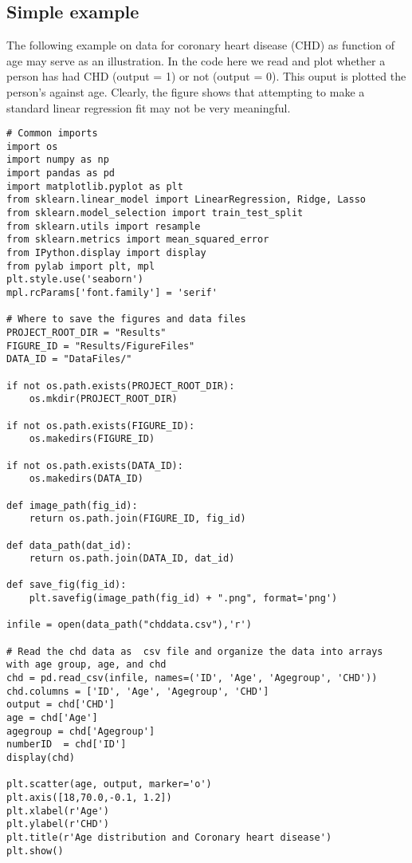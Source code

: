 \documentclass[%
oneside,                 %
final,                   %
10pt]{article}
\begin{document}
\subsection*{Simple example}

The following example on data for coronary heart disease (CHD) as function of age may serve as an illustration. In the code here we read and plot whether a person has had CHD (output = 1) or not (output = 0). This ouput  is plotted the person's against age. Clearly, the figure shows that attempting to make a standard linear regression fit may not be very meaningful.

\begin{verbatim}
# Common imports
import os
import numpy as np
import pandas as pd
import matplotlib.pyplot as plt
from sklearn.linear_model import LinearRegression, Ridge, Lasso
from sklearn.model_selection import train_test_split
from sklearn.utils import resample
from sklearn.metrics import mean_squared_error
from IPython.display import display
from pylab import plt, mpl
plt.style.use('seaborn')
mpl.rcParams['font.family'] = 'serif'

# Where to save the figures and data files
PROJECT_ROOT_DIR = "Results"
FIGURE_ID = "Results/FigureFiles"
DATA_ID = "DataFiles/"

if not os.path.exists(PROJECT_ROOT_DIR):
    os.mkdir(PROJECT_ROOT_DIR)

if not os.path.exists(FIGURE_ID):
    os.makedirs(FIGURE_ID)

if not os.path.exists(DATA_ID):
    os.makedirs(DATA_ID)

def image_path(fig_id):
    return os.path.join(FIGURE_ID, fig_id)

def data_path(dat_id):
    return os.path.join(DATA_ID, dat_id)

def save_fig(fig_id):
    plt.savefig(image_path(fig_id) + ".png", format='png')

infile = open(data_path("chddata.csv"),'r')

# Read the chd data as  csv file and organize the data into arrays with age group, age, and chd
chd = pd.read_csv(infile, names=('ID', 'Age', 'Agegroup', 'CHD'))
chd.columns = ['ID', 'Age', 'Agegroup', 'CHD']
output = chd['CHD']
age = chd['Age']
agegroup = chd['Agegroup']
numberID  = chd['ID'] 
display(chd)

plt.scatter(age, output, marker='o')
plt.axis([18,70.0,-0.1, 1.2])
plt.xlabel(r'Age')
plt.ylabel(r'CHD')
plt.title(r'Age distribution and Coronary heart disease')
plt.show()
\end{verbatim}
\end{document}
